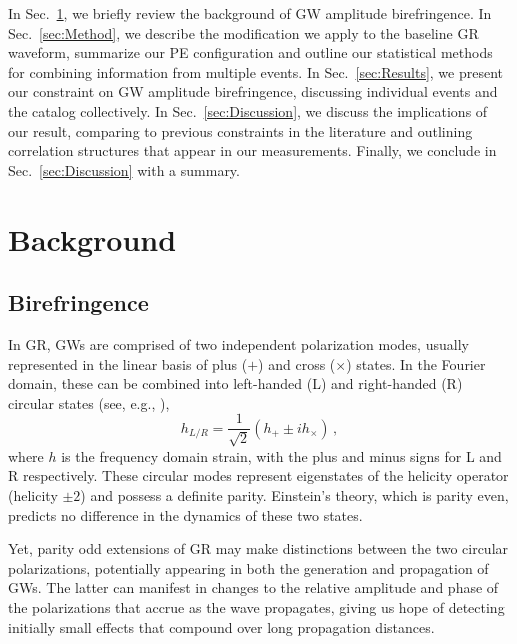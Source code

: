 \documentclass[aps,prd,twocolumn,superscriptaddress,preprintnumbers,nofootinbib]{revtex4-2}
\begin{document}
In Sec.~\ref{sec:Background}, we briefly review the background of \ac{GW} amplitude birefringence.
In Sec.~\ref{sec:Method}, we describe the modification we apply to the baseline \ac{GR} waveform, summarize our \ac{PE} configuration and outline our statistical methods for combining information from multiple events.
In Sec.~\ref{sec:Results}, we present our constraint on \ac{GW} amplitude birefringence, discussing individual events and the catalog collectively.
In Sec.~\ref{sec:Discussion}, we discuss the implications of our result, comparing to previous constraints in the literature and outlining correlation structures that appear in our measurements.
Finally, we conclude in Sec.~\ref{sec:Discussion} with a summary.

\section{Background}
\label{sec:Background}

\subsection{Birefringence}
\label{sec:waveform}

In \ac{GR}, \acp{GW} are comprised of two independent polarization modes, usually represented in the linear basis of plus ($+$) and cross ($\times$) states.
In the Fourier domain, these can be combined into left-handed (L) and right-handed (R) circular states (see, e.g., \cite{Isi:2022mbx}),
\begin{equation}
    h_{L/R} = \frac{1}{\sqrt{2}}\left(h_+ \pm i h_\times\right)\,,
\end{equation}
where $h$ is the frequency domain strain, with the plus and minus signs for L and R respectively.
These circular modes represent eigenstates of the helicity operator (helicity $\pm2$) and possess a definite parity.
Einstein's theory, which is parity even, predicts no difference in the dynamics of these two states.

Yet, parity odd extensions of \ac{GR} may make distinctions between the two circular polarizations, potentially appearing in both the generation and propagation of \acp{GW}.
The latter can manifest in changes to the relative amplitude and phase of the polarizations that accrue as the wave propagates, giving us hope of detecting initially small effects that compound over long propagation distances.
\end{document}
